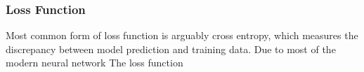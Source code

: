 \subsubsection{Loss Function}

Most common form of loss function is arguably cross entropy, which measures the discrepancy between model prediction and training data. Due to most of the modern neural network The loss function 